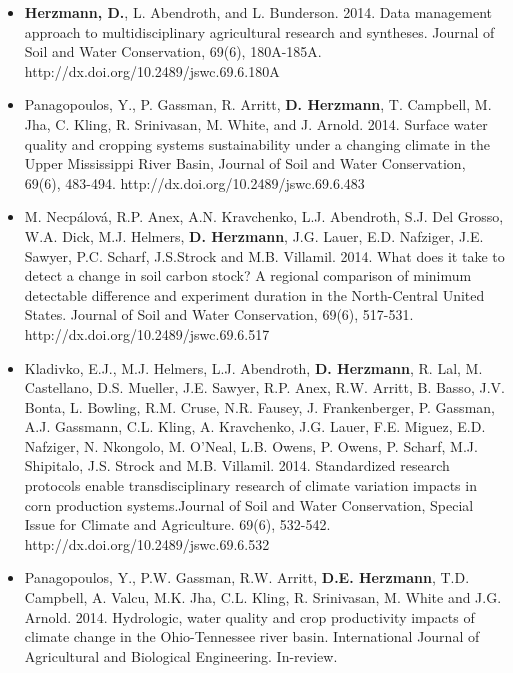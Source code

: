 \begin{itemize}
\item \textbf{Herzmann, D.}, L. Abendroth, and L. Bunderson. 2014. Data management approach to multidisciplinary agricultural research and syntheses. Journal of Soil and Water Conservation, 69(6), 180A-185A. http://dx.doi.org/10.2489/jswc.69.6.180A
\item Panagopoulos, Y., P. Gassman, R. Arritt, \textbf{D. Herzmann}, T. Campbell, M. Jha, C. Kling, R. Srinivasan, M. White, and J. Arnold. 2014. Surface water quality and cropping systems sustainability under a changing climate in the Upper Mississippi River Basin, Journal of Soil and Water Conservation, 69(6), 483-494. http://dx.doi.org/10.2489/jswc.69.6.483
\item M. Necpálová, R.P. Anex, A.N. Kravchenko, L.J. Abendroth, S.J. Del Grosso, W.A. Dick, M.J. Helmers, \textbf{D. Herzmann}, J.G. Lauer, E.D. Nafziger, J.E. Sawyer, P.C. Scharf, J.S.Strock and M.B. Villamil. 2014. What does it take to detect a change in soil carbon stock? A regional comparison of minimum detectable difference and experiment duration in the North-Central United States. Journal of Soil and Water Conservation, 69(6), 517-531. http://dx.doi.org/10.2489/jswc.69.6.517
\item Kladivko, E.J., M.J. Helmers, L.J. Abendroth, \textbf{D. Herzmann}, R. Lal, M. Castellano, D.S. Mueller, J.E. Sawyer, R.P. Anex, R.W. Arritt, B. Basso, J.V. Bonta, L. Bowling, R.M. Cruse, N.R. Fausey, J. Frankenberger, P. Gassman, A.J. Gassmann, C.L. Kling, A. Kravchenko, J.G. Lauer, F.E. Miguez, E.D. Nafziger, N. Nkongolo, M. O'Neal, L.B. Owens, P. Owens, P. Scharf, M.J. Shipitalo, J.S. Strock and M.B. Villamil. 2014. Standardized research protocols enable transdisciplinary research of climate variation impacts in corn production systems.Journal of Soil and Water Conservation, Special Issue for Climate and Agriculture. 69(6), 532-542. http://dx.doi.org/10.2489/jswc.69.6.532
\item Panagopoulos, Y., P.W. Gassman, R.W. Arritt, \textbf{D.E. Herzmann}, T.D. Campbell, A. Valcu, M.K. Jha, C.L. Kling, R. Srinivasan, M. White and J.G. Arnold. 2014. Hydrologic, water quality and crop productivity impacts of climate change in the Ohio-Tennessee river basin. International Journal of Agricultural and Biological Engineering. In-review.

\end{itemize}
